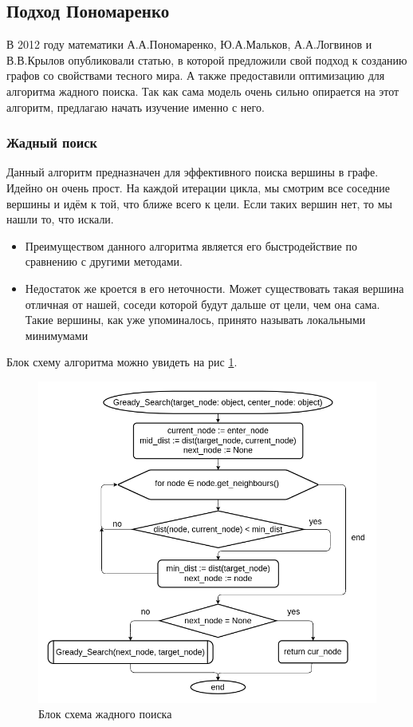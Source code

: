 \subsection{Подход Пономаренко}

В 2012 году математики А.А.Пономаренко, Ю.А.Мальков, А.А.Логвинов и В.В.Крылов
опубликовали статью, в которой предложили свой подход к созданию графов со свойствами 
тесного мира. А также предоставили оптимизацию для алгоритма жадного поиска. Так как сама модель
очень сильно опирается на этот алгоритм, предлагаю начать изучение именно с него.

\subsubsection{Жадный поиск}
Данный алгоритм предназначен для эффективного поиска вершины в графе. Идейно он очень прост.
На каждой итерации цикла, мы смотрим все соседние вершины и идём к той, что ближе всего к цели.
Если таких вершин нет, то мы нашли то, что искали.

\begin{itemize}
    \item Преимуществом данного алгоритма является его быстродействие по сравнению с другими методами. 
    \item Недостаток же кроется в его неточности. Может существовать такая вершина отличная
    от нашей, соседи которой будут дальше от цели, чем она сама. Такие вершины, как уже упоминалось,
    принято называть локальными минимумами 
\end{itemize}

Блок схему алгоритма можно увидеть на рис \ref{grady_search_block_scheme}. 

\begin{figure}[H]
    \centering
    \includegraphics[scale=0.6]{./pictures/Gready_Search.png}
    \caption{Блок схема жадного поиска} \label{grady_search_block_scheme}
\end{figure}

